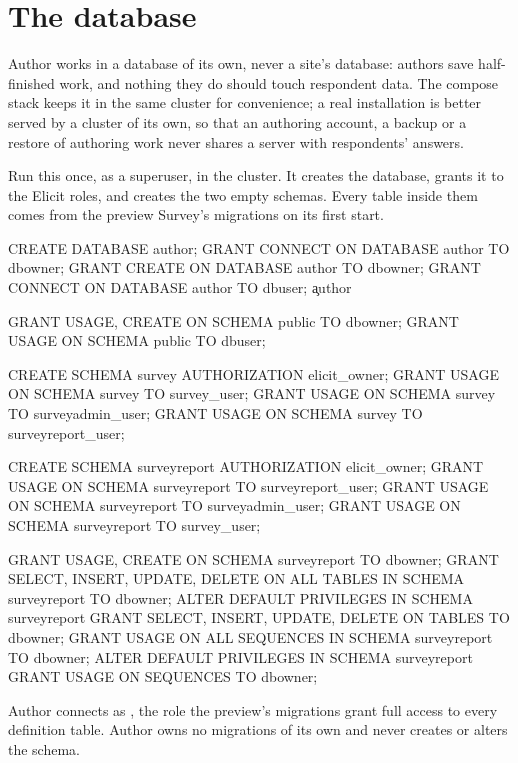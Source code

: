 \documentclass[11pt, a4paper]{article}
\begin{document}
\section{The database}
\label{sec:database}

Author works in a database of its own, never a site's  database: authors save
half-finished work, and nothing they do should touch respondent data. The compose stack keeps
it in the same cluster for convenience; a real installation is better served by a cluster of
its own, so that an authoring account, a backup or a restore of authoring work never shares a
server with respondents' answers.

Run this once, as a superuser, in the cluster. It creates the database, grants it to the
Elicit roles, and creates the two empty schemas. Every table inside them comes from the
preview Survey's migrations on its first start.

\begin{elicitsql}
CREATE DATABASE author;
GRANT CONNECT ON DATABASE author TO dbowner;
GRANT CREATE ON DATABASE author TO dbowner;
GRANT CONNECT ON DATABASE author TO dbuser;
\c author

GRANT USAGE, CREATE ON SCHEMA public TO dbowner;
GRANT USAGE ON SCHEMA public TO dbuser;

CREATE SCHEMA survey AUTHORIZATION elicit_owner;
GRANT USAGE ON SCHEMA survey TO survey_user;
GRANT USAGE ON SCHEMA survey TO surveyadmin_user;
GRANT USAGE ON SCHEMA survey TO surveyreport_user;

CREATE SCHEMA surveyreport AUTHORIZATION elicit_owner;
GRANT USAGE ON SCHEMA surveyreport TO surveyreport_user;
GRANT USAGE ON SCHEMA surveyreport TO surveyadmin_user;
GRANT USAGE ON SCHEMA surveyreport TO survey_user;

GRANT USAGE, CREATE ON SCHEMA surveyreport TO dbowner;
GRANT SELECT, INSERT, UPDATE, DELETE
  ON ALL TABLES IN SCHEMA surveyreport TO dbowner;
ALTER DEFAULT PRIVILEGES IN SCHEMA surveyreport
  GRANT SELECT, INSERT, UPDATE, DELETE ON TABLES TO dbowner;
GRANT USAGE ON ALL SEQUENCES IN SCHEMA surveyreport TO dbowner;
ALTER DEFAULT PRIVILEGES IN SCHEMA surveyreport
  GRANT USAGE ON SEQUENCES TO dbowner;
\end{elicitsql}

Author connects as , the role the preview's migrations grant full access to
every definition table. Author owns no migrations of its own and never creates or alters the
schema.
\end{document}
